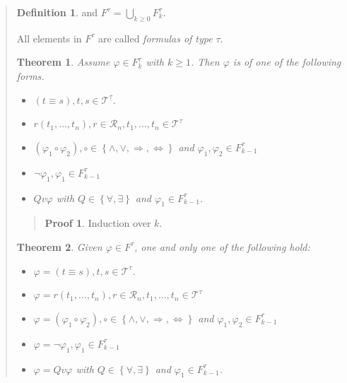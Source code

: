 \documentclass[a4paper, 12pt]{article}
\newtheorem{theorem}{Theorem}
\theoremstyle{definition}
\theoremstyle{definition}
\theoremstyle{definition}
\newtheorem{definition}{Definition}
\newtheorem{pro}{Proof}
\begin{document}
\begin{quote}
\begin{definition}
    and $F^\tau = \bigcup_{k\geq 0} F_k^\tau$.
\end{definition}

All elements in $F^\tau$ are called \textit{formulas of type } $\tau$.

\begin{theorem}
    Assume $\varphi \in F_k^\tau$ with $k \geq 1$. Then $\varphi$ is of one of 
    the following forms. 

    \begin{itemize}
        \item $(t \equiv s), t, s \in \mathcal{T}^\tau$.
        \item $r(t_1, \ldots, t_n), r \in \mathcal{R}_n, t_1, \ldots, t_n \in \mathcal{T}^\tau$
        \item $(\varphi_1 \circ \varphi_2), \circ \in \left\{ \land , \lor , \Rightarrow, \iff \right\} $ and $\varphi_1, \varphi_2 \in  F_{k-1}^{\tau}$
        \item $\neg \varphi_1, \varphi_1 \in F_{k-1}^{\tau}$
        \item $Q v \varphi$ with $Q \in \left\{ \forall , \exists  \right\} $ and $\varphi_1 \in F_{k-1}^{\tau}$.
    \end{itemize}
\end{theorem}


\small
\begin{quote}

\begin{pro}
    Induction over $k$.
\end{pro}

\end{quote}
\normalsize

\begin{theorem}
    Given $\varphi \in F^\tau$, one and only one of the following hold: 

    \begin{itemize}
        \item $\varphi = (t \equiv s), t, s \in \mathcal{T}^\tau$.
        \item $\varphi = r(t_1, \ldots, t_n), r \in \mathcal{R}_n, t_1, \ldots, t_n \in \mathcal{T}^\tau$
        \item $\varphi = (\varphi_1 \circ \varphi_2), \circ \in \left\{ \land , \lor , \Rightarrow, \iff \right\} $ and $\varphi_1, \varphi_2 \in  F_{k-1}^{\tau}$
        \item $\varphi = \neg \varphi_1, \varphi_1 \in F_{k-1}^{\tau}$
        \item $\varphi = Q v \varphi$ with $Q \in \left\{ \forall , \exists  \right\} $ and $\varphi_1 \in F_{k-1}^{\tau}$.
    \end{itemize}


\end{theorem}
\end{quote}
\end{document}
